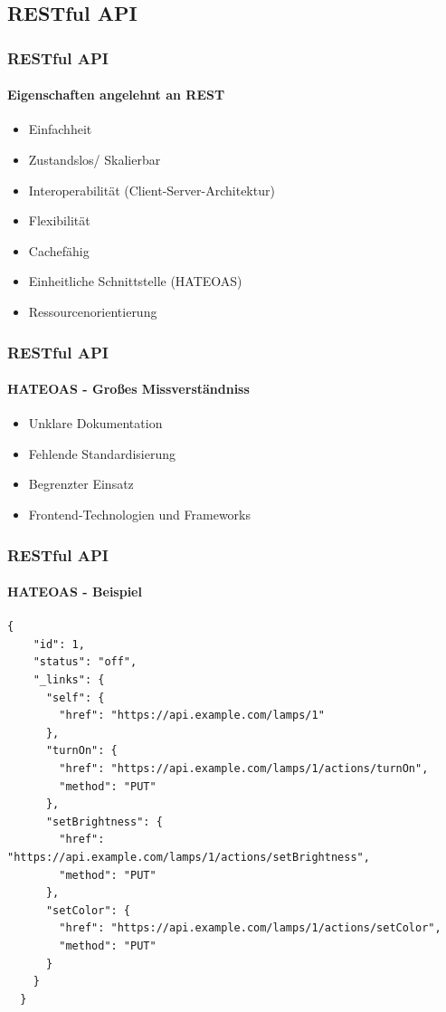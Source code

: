 \subsection{RESTful API}
\begin{frame}
  \frametitle{RESTful API}
  \framesubtitle{Eigenschaften angelehnt an REST}
  \begin{itemize}
    \item Einfachheit
    \item Zustandslos/ Skalierbar
    \item Interoperabilität (Client-Server-Architektur)
    \item Flexibilität
    \item Cachefähig
    \item Einheitliche Schnittstelle (HATEOAS)
    \item Ressourcenorientierung
  \end{itemize}
\end{frame}

\begin{frame}
  \frametitle{RESTful API}
  \framesubtitle{HATEOAS - Großes Missverständniss}
  \begin{itemize}
    \item Unklare Dokumentation
    \item Fehlende Standardisierung
    \item Begrenzter Einsatz
    \item Frontend-Technologien und Frameworks
  \end{itemize}
\end{frame}

\begin{frame} [fragile]
  \frametitle{RESTful API}
  \framesubtitle{HATEOAS - Beispiel}
  \begin{minipage}{\textwidth}
  \begin{lstlisting}[basicstyle=\tiny, caption={HATEOAS Lampe},captionpos=b,label={lst:hateoas}]
  {
    "id": 1,
    "status": "off",
    "_links": {
      "self": {
        "href": "https://api.example.com/lamps/1"
      },
      "turnOn": {
        "href": "https://api.example.com/lamps/1/actions/turnOn",
        "method": "PUT"
      },
      "setBrightness": {
        "href": "https://api.example.com/lamps/1/actions/setBrightness",
        "method": "PUT"
      },
      "setColor": {
        "href": "https://api.example.com/lamps/1/actions/setColor",
        "method": "PUT"
      }
    }
  }
  \end{lstlisting}
  \end{minipage}
\end{frame}


